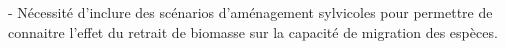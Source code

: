 - Nécessité d'inclure des scénarios d'aménagement sylvicoles pour permettre de connaitre l'effet du retrait de biomasse sur la capacité de migration des espèces.


%
%



%
%
%
